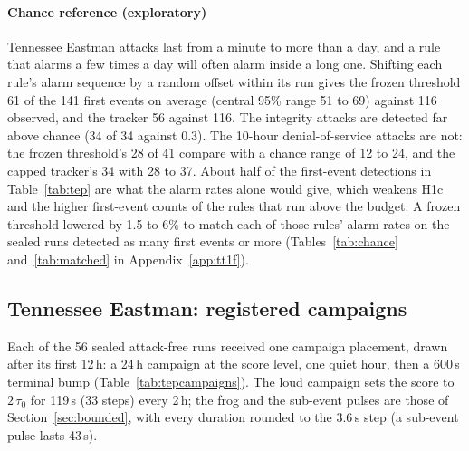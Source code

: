 \documentclass[sigconf,review,anonymous]{acmart}
\begin{document}
\paragraph{Chance reference (exploratory)}
Tennessee Eastman attacks last from a minute to more than a day, and a rule that alarms a few times a
day will often alarm inside a long one. Shifting each rule's alarm sequence by a random offset within
its run gives the frozen threshold 61 of the 141 first events on average (central 95\% range 51 to
69) against 116 observed, and the tracker 56 against 116. The integrity attacks are detected far above
chance (34 of 34 against 0.3). The 10-hour denial-of-service attacks are not: the frozen threshold's 28
of 41 compare with a chance range of 12 to 24, and the capped tracker's 34 with 28 to 37. About half
of the first-event detections in Table~\ref{tab:tep} are what the alarm rates alone would give, which
weakens H1c and the higher first-event counts of the rules that run above the budget. A frozen
threshold lowered by 1.5 to 6\% to match each of those rules' alarm rates on the sealed runs detected
as many first events or more (Tables~\ref{tab:chance} and~\ref{tab:matched} in Appendix~\ref{app:tt1f}).

\subsection{Tennessee Eastman: registered campaigns}
\label{sec:tepcampaigns}

Each of the 56 sealed attack-free runs received one campaign placement, drawn after its first 12\,h: a
24\,h campaign at the score level, one quiet hour, then a 600\,s terminal bump
(Table~\ref{tab:tepcampaigns}). The loud campaign sets the score to $2\,\tau_0$ for 119\,s (33 steps) every 2\,h;
the frog and the sub-event pulses are those of Section~\ref{sec:bounded}, with every duration rounded
to the 3.6\,s step (a sub-event pulse lasts 43\,s).
\end{document}
